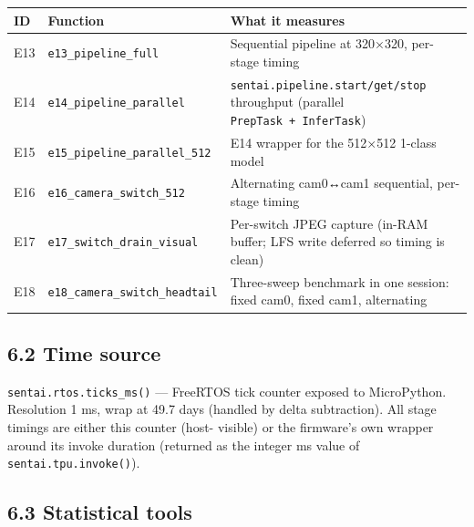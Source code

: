 {\def\LTcaptype{none} %
\begin{longtable}[]{@{}
  >{\raggedright\arraybackslash}p{}
  >{\raggedright\arraybackslash}p{}
  >{\raggedright\arraybackslash}p{}@{}}
\toprule\noalign{}
\begin{minipage}[b]{\linewidth}\raggedright
ID
\end{minipage} & \begin{minipage}[b]{\linewidth}\raggedright
Function
\end{minipage} & \begin{minipage}[b]{\linewidth}\raggedright
What it measures
\end{minipage} \\
\midrule\noalign{}
\endhead
\bottomrule\noalign{}
\endlastfoot
E13 & \texttt{e13\_pipeline\_full} & Sequential pipeline at 320×320,
per-stage timing \\
E14 & \texttt{e14\_pipeline\_parallel} &
\texttt{sentai.pipeline.start/get/stop} throughput (parallel
\texttt{PrepTask\ +\ InferTask}) \\
E15 & \texttt{e15\_pipeline\_parallel\_512} & E14 wrapper for the
512×512 1-class model \\
E16 & \texttt{e16\_camera\_switch\_512} & Alternating cam0↔cam1
sequential, per-stage timing \\
E17 & \texttt{e17\_switch\_drain\_visual} & Per-switch JPEG capture
(in-RAM buffer; LFS write deferred so timing is clean) \\
E18 & \texttt{e18\_camera\_switch\_headtail} & Three-sweep benchmark in
one session: fixed cam0, fixed cam1, alternating \\
\end{longtable}
}

\subsection{6.2 Time source}\label{time-source}

\texttt{sentai.rtos.ticks\_ms()} --- FreeRTOS tick counter exposed to
MicroPython. Resolution 1 ms, wrap at 49.7 days (handled by delta
subtraction). All stage timings are either this counter (host- visible)
or the firmware's own wrapper around its invoke duration (returned as
the integer ms value of \texttt{sentai.tpu.invoke()}).

\subsection{6.3 Statistical tools}\label{statistical-tools}

